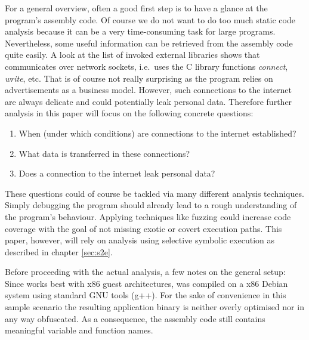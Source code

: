 \bigskip
For a general overview, often a good first step is to have a glance at the program's assembly code.
Of course we do not want to do too much static code analysis because it can be a very time-consuming task for large programs.
Nevertheless, some useful information can be retrieved from the assembly code quite easily.
A look at the list of invoked external libraries shows that \app communicates over network sockets, i.e.~uses the C library functions \textit{connect}, \textit{write}, etc.
That is of course not really surprising as the program relies on advertisements as a business model.
However, such connections to the internet are always delicate and could potentially leak personal data.
Therefore further analysis in this paper will focus on the following concrete questions:
\begin{enumerate}
  \item When (under which conditions) are connections to the internet established?
  \item What data is transferred in these connections?
  \item Does a connection to the internet leak personal data?
\end{enumerate}
These questions could of course be tackled via many different analysis techniques.
Simply debugging the program should already lead to a rough understanding of the program's behaviour.
Applying techniques like fuzzing could increase code coverage with the goal of not missing exotic or covert execution paths.
This paper, however, will rely on analysis using selective symbolic execution as described in chapter \ref{sec:s2e}.

\bigskip

Before proceeding with the actual analysis, a few notes on the general setup: 
Since \sse works best with x86 guest architectures, \app was compiled on a x86 Debian system using standard GNU tools (g++).
For the sake of convenience in this sample scenario the resulting application binary is neither overly optimised nor in any way obfuscated.
As a consequence, the assembly code still contains meaningful variable and function names.


\iffalse
§4	Project idea: explore privacy issues in a sample binary
		> Plan darlegen: Programme könnten unerwünscht Infos preisgeben.
		> Daher: Eigenes kleines Programm, das … macht.
\fi